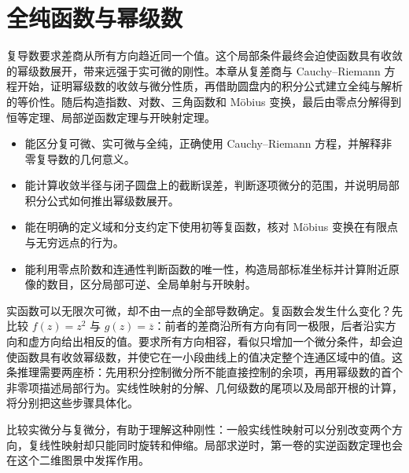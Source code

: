 \chapter{全纯函数与幂级数}
\label{b3:ch:01}
\begin{chapterabstract}
复导数要求差商从所有方向趋近同一个值。这个局部条件最终会迫使函数具有收敛的幂级数展开，带来远强于实可微的刚性。本章从复差商与 Cauchy--Riemann 方程开始，证明幂级数的收敛与微分性质，再借助圆盘内的积分公式建立全纯与解析的等价性。随后构造指数、对数、三角函数和 Möbius 变换，最后由零点分解得到恒等定理、局部逆函数定理与开映射定理。
\end{chapterabstract}

\begin{learninggoals}
\begin{itemize}
\item\label{b3:item:01-goal-derivative}能区分复可微、实可微与全纯，正确使用 Cauchy--Riemann 方程，并解释非零复导数的几何意义。
\item\label{b3:item:01-goal-series}能计算收敛半径与闭子圆盘上的截断误差，判断逐项微分的范围，并说明局部积分公式如何推出幂级数展开。
\item\label{b3:item:01-goal-elementary}能在明确的定义域和分支约定下使用初等复函数，核对 Möbius 变换在有限点与无穷远点的行为。
\item\label{b3:item:01-goal-local}能利用零点阶数和连通性判断函数的唯一性，构造局部标准坐标并计算附近原像的数目，区分局部可逆、全局单射与开映射。
\end{itemize}
\end{learninggoals}

实函数可以无限次可微，却不由一点的全部导数确定。复函数会发生什么变化？先比较 \(f(z)=z^2\) 与 \(g(z)=\overline z\)：前者的差商沿所有方向有同一极限，后者沿实方向和虚方向给出相反的值。要求所有方向相容，看似只增加一个微分条件，却会迫使函数具有收敛幂级数，并使它在一小段曲线上的值决定整个连通区域中的值。这条推理需要两座桥：先用积分控制微分所不能直接控制的余项，再用幂级数的首个非零项描述局部行为。实线性映射的分解、几何级数的尾项以及局部开根的计算，将分别把这些步骤具体化。

\ProseParagraphBreak

比较实微分与复微分，有助于理解这种刚性：一般实线性映射可以分别改变两个方向，复线性映射却只能同时旋转和伸缩。局部求逆时，第一卷的实逆函数定理也会在这个二维图景中发挥作用。

\ProseParagraphBreak

